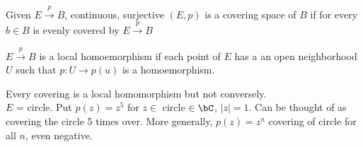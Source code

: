 \begin{definition}
    Given $E \stackrel{p}{\to} B$, continuous, surjective $(E,p)$ is a covering space of $B$ if for every $b \in B$ is evenly covered by $E \stackrel{p}{\to} B$  
\end{definition}

\begin{definition}
    $E \stackrel{p}{\to} B$ is a local homoemorphism if each point of $E$ has a an open neighborhood $U$ such that $p: U \to p(u)$ is a homoemorphism. 
\end{definition}

\noindent
Every covering is a local homomorphism but not conversely. \\
$E$ = circle. Put $p(z) = z^5$ for $z \in$ circle $ \in \bC$, $|z|=1$. Can be thought of as covering the circle 5 times over. More generally, $p(z)=z^n$ covering of circle for all $n$, even negative. 